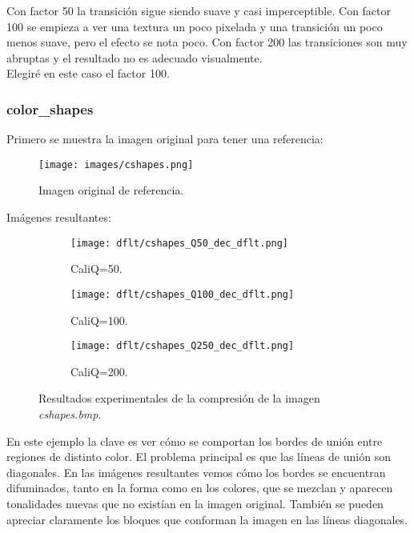 \documentclass[12pt,a4paper]{article}
\begin{document}
Con factor 50 la transición sigue siendo suave y casi imperceptible. Con factor 100 se empieza a ver una textura un poco pixelada y una transición un poco menos suave, pero el efecto se nota poco. Con factor 200 las transiciones son muy abruptas y el resultado no es adecuado visualmente.\\

Elegiré en este caso el factor 100.

\subsubsection{color\_shapes}
Primero se muestra la imagen original para tener una referencia:
\begin{figure}[H]
    \centering
    \texttt{[image: images/cshapes.png]}
    \caption[Referencia - color\_shapes]{Imagen original de referencia.}
    
\end{figure}
    
    \vspace{0.5cm}

Imágenes resultantes:
\begin{figure}[H]
    
    \begin{subfigure}{0.30\textwidth}
        \centering
        \texttt{[image: dflt/cshapes\_Q50\_dec\_dflt.png]}
        \caption{CaliQ=50.}
        
    \end{subfigure}
    \hfill
    \begin{subfigure}{0.30\textwidth}
        \centering
        \texttt{[image: dflt/cshapes\_Q100\_dec\_dflt.png]}
        \caption{CaliQ=100.}
        
    \end{subfigure}
    \hfill
    \begin{subfigure}{0.30\textwidth}
        \centering
        \texttt{[image: dflt/cshapes\_Q250\_dec\_dflt.png]}
        \caption{CaliQ=200.}
        
    \end{subfigure}
    
    \caption[Resultados experimentales - color\_shapes]{Resultados experimentales de la compresión de la imagen \textit{cshapes.bmp}.}
    
\end{figure}

En este ejemplo la clave es ver cómo se comportan los bordes de unión entre regiones de distinto color. El problema principal es que las líneas de unión son diagonales. En las imágenes resultantes vemos cómo los bordes se encuentran difuminados, tanto en la forma como en los colores, que se mezclan y aparecen tonalidades nuevas que no existían en la imagen original. También se pueden apreciar claramente los bloques que conforman la imagen en las líneas diagonales.\\
\end{document}
